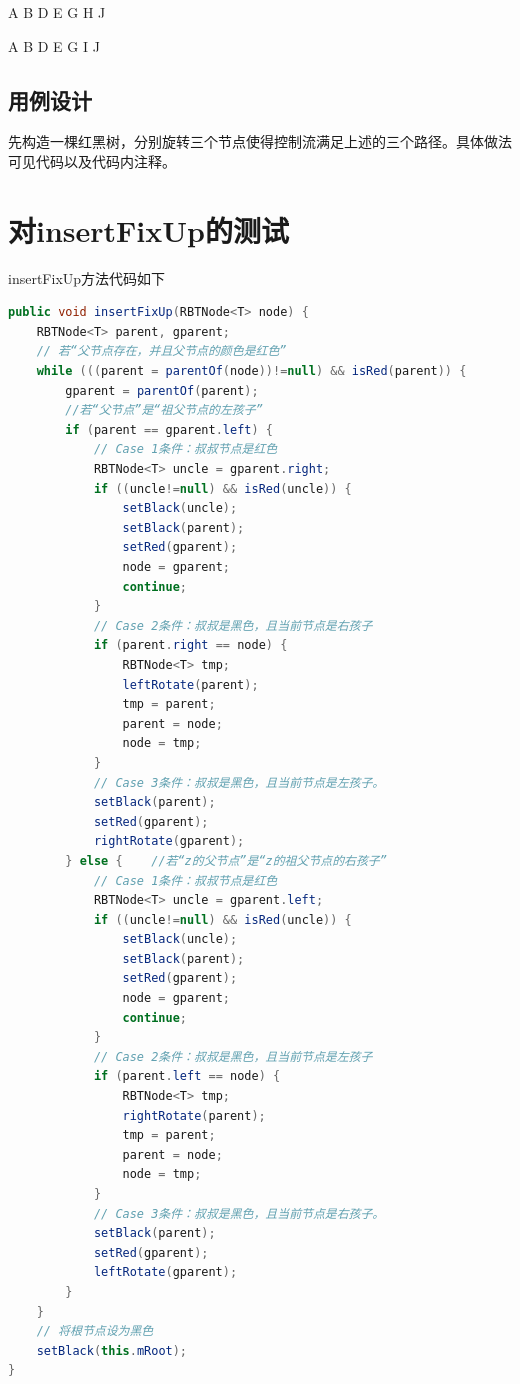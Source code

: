 \documentclass[12pt, a4paper, oneside]{ctexart}
\begin{document}
A B D E G H J

A B D E G I J

\subsection{用例设计}

先构造一棵红黑树，分别旋转三个节点使得控制流满足上述的三个路径。具体做法可见代码以及代码内注释。

\section{对insertFixUp的测试}
insertFixUp方法代码如下

\begin{lstlisting}[language=Java]
public void insertFixUp(RBTNode<T> node) {
    RBTNode<T> parent, gparent;
    // 若“父节点存在，并且父节点的颜色是红色”
    while (((parent = parentOf(node))!=null) && isRed(parent)) {
        gparent = parentOf(parent);
        //若“父节点”是“祖父节点的左孩子”
        if (parent == gparent.left) {
            // Case 1条件：叔叔节点是红色
            RBTNode<T> uncle = gparent.right;
            if ((uncle!=null) && isRed(uncle)) {
                setBlack(uncle);
                setBlack(parent);
                setRed(gparent);
                node = gparent;
                continue;
            }
            // Case 2条件：叔叔是黑色，且当前节点是右孩子
            if (parent.right == node) {
                RBTNode<T> tmp;
                leftRotate(parent);
                tmp = parent;
                parent = node;
                node = tmp;
            }
            // Case 3条件：叔叔是黑色，且当前节点是左孩子。
            setBlack(parent);
            setRed(gparent);
            rightRotate(gparent);
        } else {    //若“z的父节点”是“z的祖父节点的右孩子”
            // Case 1条件：叔叔节点是红色
            RBTNode<T> uncle = gparent.left;
            if ((uncle!=null) && isRed(uncle)) {
                setBlack(uncle);
                setBlack(parent);
                setRed(gparent);
                node = gparent;
                continue;
            }
            // Case 2条件：叔叔是黑色，且当前节点是左孩子
            if (parent.left == node) {
                RBTNode<T> tmp;
                rightRotate(parent);
                tmp = parent;
                parent = node;
                node = tmp;
            }
            // Case 3条件：叔叔是黑色，且当前节点是右孩子。
            setBlack(parent);
            setRed(gparent);
            leftRotate(gparent);
        }
    }
    // 将根节点设为黑色
    setBlack(this.mRoot);
}
\end{lstlisting}
\end{document}
